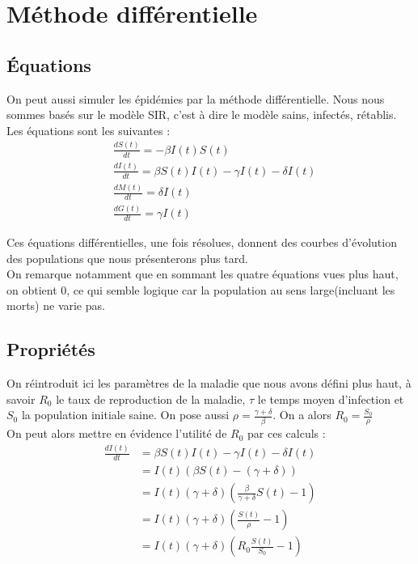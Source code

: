 \documentclass{article}
\begin{document}
\section{Méthode différentielle}
\subsection{Équations}
	On peut aussi simuler les épidémies par la méthode différentielle. Nous nous sommes basés sur le modèle SIR, c'est à dire le modèle sains, infectés, rétablis. Les équations sont les suivantes :\\
	\begin{align}
		&\frac{dS(t)}{dt} = - \beta I(t)S(t) \\
		&\frac{dI(t)}{dt} = \beta S(t)I(t) - \gamma I(t) - \delta I(t) \\
		&\frac{dM(t)}{dt} = \delta I(t) \\
		&\frac{dG(t)}{dt} = \gamma I(t)
	\end{align}
	
	Ces équations différentielles, une fois résolues, donnent des courbes d'évolution des populations que nous présenterons plus tard.\\
	On remarque notamment que en sommant les quatre équations vues plus haut, on obtient $0$, ce qui semble logique car la population au sens large(incluant les morts) ne varie pas.

\subsection{Propriétés}
	On réintroduit ici les paramètres de la maladie que nous avons défini plus haut, à savoir $R_0$ le taux de reproduction de la maladie, $\tau$ le temps moyen d'infection et $S_0$ la population initiale saine. On pose aussi $\rho = \frac{\gamma + \delta}{\beta}$. On a alors $R_0 = \frac{S_0}{\rho}$ \\
	On peut alors mettre en évidence l'utilité de $R_0$ par ces calculs : \\
	\begin{align*}	
	\frac{dI(t)}{dt} &= \beta S(t)I(t) - \gamma I(t) - \delta I(t) \\
					 &= I(t)(\beta S(t) - (\gamma + \delta) ) \\
					 &= I(t)(\gamma + \delta)(\frac{\beta}{\gamma + \delta}S(t) - 1) \\ 
					 &= I(t)(\gamma + \delta)(\frac{S(t)}{\rho} - 1) \\
					 &= I(t)(\gamma + \delta)(R_0 \frac{S(t)}{S_0} - 1)	
	\end{align*}
	
\end{document}
